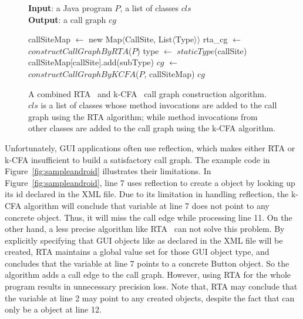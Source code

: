 \begin{figure}[t]
\textbf{Input}: a Java program $P$, a list of classes $cls$\\
\textbf{Output}: a call graph $cg$\\
\vspace{-5mm}
\begin{algorithmic}[1]
\STATE callSiteMap $\leftarrow$ new Map$\langle$CallSite, List$\langle$Type$\rangle$$\rangle$
\STATE rta\_cg $\leftarrow$ $constructCallGraphByRTA$($P$)
\STATE type $\leftarrow$ $staticType$(callSite)
\STATE callSiteMap[callSite].add(subType)
\ENDIF
\ENDFOR
\ENDIF
\ENDFOR
\ENDFOR
\STATE $cg$ $\leftarrow$ $constructCallGraphByKCFA$($P$, callSiteMap)
\RETURN $cg$
\vspace{-2mm}
\end{algorithmic}
\label{fig:cgalgorithm}
\caption{A combined  RTA~\cite{rta} and k-CFA~\cite{kcfa} call graph construction algorithm.
$cls$ is a list of classes whose method invocations are added to the
call graph using the RTA algorithm; while method invocations from other classes
are added to the call graph using the k-CFA algorithm.
} 
\end{figure}


Unfortunately, GUI applications often use reflection, which makes either
RTA or k-CFA insufficient to build a satisfactory call graph. 
The example code in Figure~\ref{fig:sampleandroid}  illustrates their limitations.
In Figure~\ref{fig:sampleandroid}, line 7 uses reflection to create a 
object by looking up its id declared in the XML file. Due to
its limitation in handling reflection, the k-CFA algorithm
will conclude that variable  at line 7 does not point to any
concrete  object. Thus, it will miss the call edge 
while processing line 11. On the other hand, a less precise algorithm like RTA~\cite{}
can not solve this problem. By explicitly specifying that GUI objects
like  as declared in the XML file will be created, RTA maintains
a global value set for those GUI object type, and concludes that the  variable
at line 7 points to a concrete Button object. So the algorithm  adds a
call edge  to the call graph. However, using RTA for
the whole program results in unnecessary precision loss. Note that,
RTA may conclude that the  variable at line 2
may point to any created  objects, despite the
fact that  can only be a  object at line 12.


